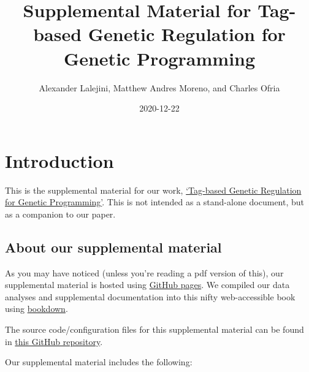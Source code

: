 \documentclass[
]{book}
\title{Supplemental Material for Tag-based Genetic Regulation for Genetic Programming}
\author{Alexander Lalejini, Matthew Andres Moreno, and Charles Ofria}
\date{2020-12-22}
\begin{document}
\maketitle

{
\setcounter{tocdepth}{1}
\tableofcontents
}
\hypertarget{introduction}{%
\chapter{Introduction}\label{introduction}}

This is the supplemental material for our work, \href{https://arxiv.org/abs/2012.09229}{`Tag-based Genetic Regulation for Genetic Programming'}.
This is not intended as a stand-alone document, but as a companion to our paper.

\hypertarget{about-our-supplemental-material}{%
\section{About our supplemental material}\label{about-our-supplemental-material}}

As you may have noticed (unless you're reading a pdf version of this), our supplemental material is hosted using \href{https://pages.github.com/}{GitHub pages}.
We compiled our data analyses and supplemental documentation into this nifty web-accessible book using \href{https://bookdown.org}{bookdown}.

The source code/configuration files for this supplemental material can be found in \href{https://github.com/amlalejini/Tag-based-Genetic-Regulation-for-LinearGP}{this GitHub repository}.

Our supplemental material includes the following:
\end{document}
